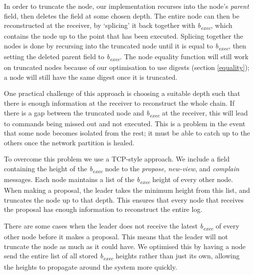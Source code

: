 In order to truncate the node, our implementation recurses into the node's \textit{parent} field, then deletes the field at some chosen depth. The entire node can then be reconstructed at the receiver, by `splicing' it back together with \textit{b\textsubscript{exec}}, which contains the node up to the point that has been executed. Splicing together the nodes is done by recursing into the truncated node until it is equal to \textit{b\textsubscript{exec}}, then setting the deleted parent field to \textit{b\textsubscript{exec}}. The node equality function will still work on truncated nodes because of our optimisation to use digests (section \ref{equality}); a node will still have the same digest once it is truncated.

One practical challenge of this approach is choosing a suitable depth such that there is enough information at the receiver to reconstruct the whole chain. If there is a gap between the truncated node and \textit{b\textsubscript{exec}} at the receiver, this will lead to commands being missed out and not executed. This is a problem in the event that some node becomes isolated from the rest; it must be able to catch up to the others once the network partition is healed.

To overcome this problem we use a TCP-style approach. We include a field containing the height of the \textit{b\textsubscript{exec}} node to the \textit{propose}, \textit{new-view}, and \textit{complain} messages. Each node maintains a list of the \textit{b\textsubscript{exec}} height of every other node. When making a proposal, the leader takes the minimum height from this list, and truncates the node up to that depth. This ensures that every node that receives the proposal has enough information to reconstruct the entire log.

There are some cases when the leader does not receive the latest \textit{b\textsubscript{exec}} of every other node before it makes a proposal. This means that the leader will not truncate the node as much as it could have. We optimised this by having a node send the entire list of all stored \textit{b\textsubscript{exec}} heights rather than just its own, allowing the heights to propagate around the system more quickly.


